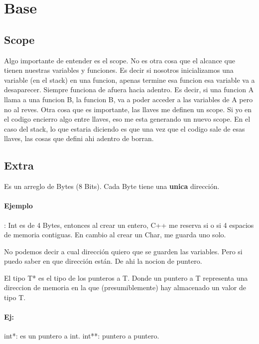 \documentclass[11pt]{article}
\begin{document}
\section{Base}
\subsection{Scope}
Algo importante de entender es el scope.
No es otra cosa que el alcance que tienen nuestras variables y funciones.
Es decir si nosotros inicializamos una variable (en el stack) en una funcion,
apenas termine esa funcion esa variable va a desaparecer.
Siempre funciona de afuera hacia adentro.
Es decir, si una funcion A llama a una funcion B, la funcion B, va a poder
acceder a las variables de A pero no al reves.
Otra cosa que es importante, las llaves {}  me definen un scope.
Si yo en el codigo encierro algo entre llaves, eso me esta generando un nuevo scope.
En el caso del stack, lo que estaria diciendo es que una vez que el codigo sale
de esas llaves, las cosas que defini ahi adentro de borran.

\subsection{Extra}
Es un arreglo de Bytes (8 Bits).
Cada Byte tiene una \textbf{unica} dirección.

\paragraph{Ejemplo}: Int es de 4 Bytes, entonces al crear un entero, C++
me reserva si o si 4 espacios de memoria contiguas.
En cambio al crear un Char, me guarda uno solo.
\vspace{.5cm}

No podemos decir a cual dirección quiero que se guarden las variables.
Pero si puedo saber en que dirección están.
De ahi la nocion de puntero.

El tipo T* es el tipo de los punteros a T.
Donde un puntero a T representa una direccion de memoria en la que
(presumiblemente) hay almacenado un valor de tipo T.

\paragraph{Ej:} int*: es un puntero a int.
int**: puntero a puntero.
\vspace{.5cm}
\end{document}
